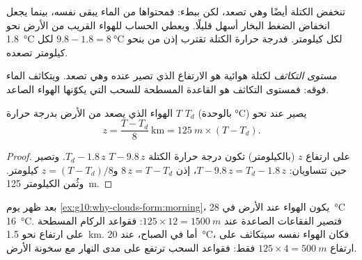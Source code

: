 تنخفض  الكتلة أيضًا وهي تصعد، لكن ببطء: فمحتواها من الماء يبقى نفسه،
بينما يجعل انخفاض الضغط  البخار أسهل قليلًا. ويعطي الحساب للهواء القريب من
الأرض نحو \qty{1.8}{\degreeCelsius} لكل كيلومتر. فدرجة حرارة الكتلة تقترب إذن من
 بنحو $9.8 - 1.8 = \qty{8}{\degreeCelsius}$
لكل كيلومتر تصعده.

\begin{definition}\label{def:g10:why-clouds-form:condensation-level}
\emph{مستوى التكاثف} لكتلة هوائية هو الارتفاع الذي تصير
عنده  وهي تصعد. ويتكاثف الماء فوقه: فمستوى التكاثف هو القاعدة المسطحة للسحب
التي يكوّنها الهواء الصاعد.
\end{definition}

\begin{proposition}\label{prop:g10:why-clouds-form:lcl}
الهواء الذي يصعد من الأرض بدرجة حرارة $T$  $T_d$
(بالوحدة \unit{\degreeCelsius}) يصير  عند نحو
\[
  z = \frac{T - T_d}{8}\ \text{km} = \qty{125}{m} \times (T - T_d).
\]
\end{proposition}

\begin{proof}
على ارتفاع $z$ (بالكيلومتر) تكون درجة حرارة الكتلة $T - 9.8\,z$ 
$T_d - 1.8\,z$. وتصير  حين تتساويان:
$T - 9.8\,z = T_d - 1.8\,z$، إذن $8\,z = T - T_d$ و$z = (T - T_d)/8$ كيلومتر.
وثُمن الكيلومتر \qty{125}{m}.
\end{proof}

\begin{example}\label{ex:g10:why-clouds-form:base}
بعد ظهر يوم \cref{ex:g10:why-clouds-form:morning}، يكون الهواء عند الأرض في
\qty{28}{\degreeCelsius} 
\qty{16}{\degreeCelsius}. فتصير الفقاعات الصاعدة  عند
$125 \times 12 = \qty{1500}{m}$: فقواعد الركام المسطحة على ارتفاع نحو
\qty{1.5}{km}. أما في الصباح، عند \qty{20}{\degreeCelsius}، فكان الهواء نفسه
سيتكاثف على ارتفاع $125 \times 4 = \qty{500}{m}$ فقط: فقواعد السحب ترتفع على مدى
النهار مع سخونة الأرض.
\end{example}

